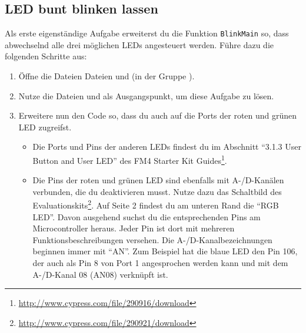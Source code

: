 \subsection{LED bunt blinken lassen}
Als erste eigenständige Aufgabe erweiterst du die Funktion \lstinline|BlinkMain| so, dass abwechselnd alle drei möglichen LEDs angesteuert werden.
%
Führe dazu die folgenden Schritte aus:
\begin{enumerate}
\item 
Öffne die Dateien Dateien  und  (in der Gruppe ).

\item 
Nutze die Dateien  und  als Ausgangspunkt, um diese Aufgabe zu lösen.

\item
Erweitere nun den Code so, dass du auch auf die Ports der roten und grünen LED zugreifst.
\begin{itemize}
\item 
Die Ports und Pins der anderen LEDs findest du \unteranderem im Abschnitt \enquote{3.1.3 User Button and User LED} des FM4 Starter Kit Guides\footnote{\url{http://www.cypress.com/file/290916/download}}.

\item 
Die Pins der roten und grünen LED sind ebenfalls mit A-/D-Kanälen verbunden, die du deaktivieren musst.
Nutze dazu das Schaltbild des Evaluationskits\footnote{\url{http://www.cypress.com/file/290921/download}}.
Auf Seite 2 findest du am unteren Rand die \enquote{RGB LED}.
Davon ausgehend suchst du die entsprechenden Pins am Microcontroller heraus.
Jeder Pin ist dort mit mehreren Funktionsbeschreibungen versehen.
Die A-/D-Kanalbezeichnungen beginnen immer mit \enquote{AN}.
Zum Beispiel hat die blaue LED den Pin 106, der auch als Pin 8 von Port 1 angesprochen werden kann und mit dem A-/D-Kanal 08 (AN08) verknüpft ist.
\end{itemize}
\end{enumerate}
